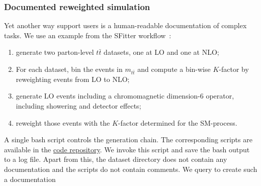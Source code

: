 \documentclass[submission, Phys]{SciPost}
\begin{document}
\subsubsection{Documented reweighted simulation}
\label{sec:apps_train_doc}

Yet another way \ma support users is a human-readable documentation of complex tasks. We use an example from the SFitter workflow~\cite{Elmer:2023wtr}:
\begin{enumerate}
    \item generate two parton-level $t \bar{t}$ datasets, one at LO and one at NLO;
    \item For each dataset, bin the events in $m_{t \bar{t}}$ and compute a bin-wise $K$-factor by reweighting events from LO to NLO;
    \item generate LO events including a chromomagnetic dimension-6 operator, including showering and detector effects;
    \item reweight those events with the $K$-factor determined for the SM-process.
\end{enumerate}
%
A single bash script controls the generation chain. The corresponding scripts are available in the \href{https://github.com/heidelberg-hepml/MadAgents/tree/main/supplementary/dataset_documentation}{code repository}. We invoke this script and save the bash output to a log file. Apart from this, the dataset directory does not contain any documentation and the scripts do not contain comments. We query \ma to create such a  documentation
\end{document}
